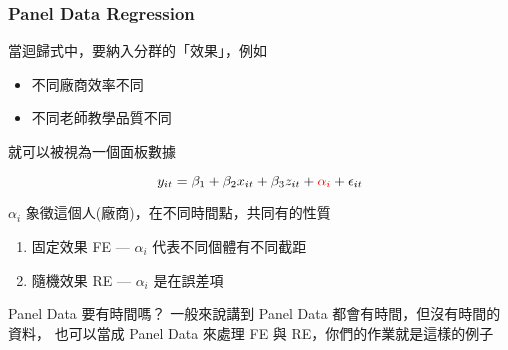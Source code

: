 \begin{frame}
    \frametitle{Panel Data Regression}
    當迴歸式中，要納入分群的「效果」，例如
    \begin{itemize}
        \item 不同廠商效率不同
        \item 不同老師教學品質不同
    \end{itemize}
    就可以被視為一個面板數據

    \begin{equation*}
        y_{it} = \beta_1 + \beta_2 x_{it} +  \beta_3 z_{it} + {\color{red} \alpha_i} + \epsilon_{it}
    \end{equation*}

    $\alpha_i$ 象徵這個人(廠商)，在不同時間點，共同有的性質
    \begin{enumerate}
        \item 固定效果 FE --- $\alpha_i$ 代表不同個體有不同截距
        \item 隨機效果 RE --- $\alpha_i$ 是在誤差項
    \end{enumerate}

    \begin{block}{Panel Data 要有時間嗎？}
        一般來說講到 Panel Data 都會有時間，但沒有時間的資料，
        也可以當成 Panel Data 來處理 FE 與 RE，你們的作業就是這樣的例子
    \end{block}

\end{frame}

